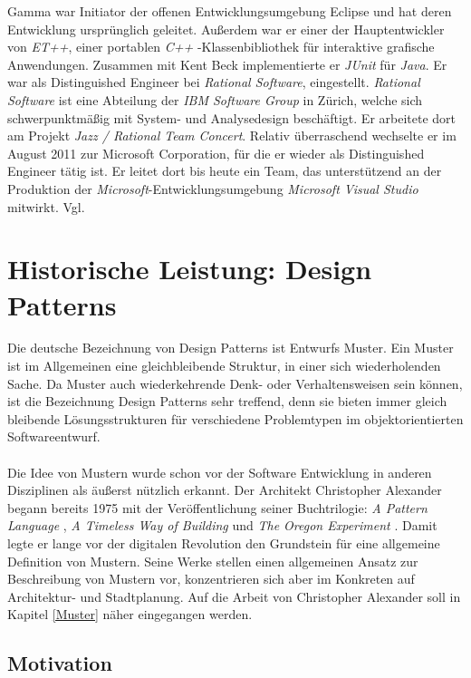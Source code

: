 \documentclass[fontsize=11pt,a4paper,final]{scrreprt}[2003/01/01]
\begin{document}
Gamma war Initiator der offenen Entwicklungsumgebung Eclipse und hat deren Entwicklung ursprünglich geleitet. Außerdem war er einer der Hauptentwickler von \textit{ET++}, einer portablen \textit{C++} -Klassenbibliothek für interaktive grafische Anwendungen. Zusammen mit Kent Beck implementierte er \textit{JUnit} für \textit{Java}. Er war als Distinguished Engineer bei \textit{Rational Software}, eingestellt. \textit{Rational Software} ist eine Abteilung der \textit{IBM Software Group} in Zürich, welche sich schwerpunktmäßig mit System- und Analysedesign beschäftigt. Er arbeitete dort am Projekt \textit{Jazz / Rational Team Concert}. Relativ überraschend wechselte er im August 2011 zur Microsoft Corporation, für die er wieder als Distinguished Engineer tätig ist. Er leitet dort bis heute ein Team, das unterstützend an der Produktion der\textit{ Microsoft}-Entwicklungsumgebung \textit{Microsoft Visual Studio} mitwirkt. Vgl. \cite{ErichGammaWikiDe}

\chapter{Historische Leistung: Design Patterns}\label{se:Historische Leistung: Design Patterns}
Die deutsche Bezeichnung von Design Patterns ist Entwurfs Muster. Ein Muster ist im Allgemeinen eine gleichbleibende Struktur, in einer sich wiederholenden Sache. Da Muster auch wiederkehrende Denk- oder Verhaltensweisen sein können, ist die Bezeichnung Design Patterns sehr treffend, denn sie bieten immer gleich bleibende Lösungsstrukturen für verschiedene Problemtypen im objektorientierten Softwareentwurf.
\\ \\
Die Idee von Mustern wurde schon vor der Software Entwicklung in anderen Disziplinen als äußerst nützlich erkannt. Der Architekt \mbox{Christopher} \mbox{Alexander} begann bereits 1975 mit der Veröffentlichung seiner Buchtrilogie: \textit{A Pattern Language} \cite{Alexander1979}, \textit{A Timeless Way of Building} \cite{Alexander1977} und \textit{The Oregon Experiment} \cite{Alexander1975}. Damit legte er lange vor der digitalen Revolution den Grundstein für eine allgemeine Definition von Mustern. Seine Werke stellen einen allgemeinen Ansatz zur Beschreibung von Mustern vor, konzentrieren sich aber im Konkreten auf Architektur- und Stadtplanung. Auf die Arbeit von Christopher Alexander soll in Kapitel \ref{Muster} näher eingegangen werden.

\section{Motivation}\label{se:Motivation}
\end{document}

